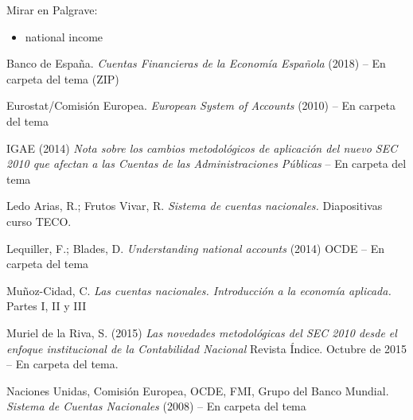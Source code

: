 \documentclass{nuevotema}
\begin{document}
\bibliografia

Mirar en Palgrave:

\begin{itemize}
	\item national income
\end{itemize}

Banco de España. \textit{Cuentas Financieras de la Economía Española} (2018) -- En carpeta del tema (ZIP)

Eurostat/Comisión Europea. \textit{European System of Accounts} (2010) -- En carpeta del tema

IGAE (2014) \textit{Nota sobre los cambios metodológicos de aplicación del nuevo SEC 2010 que afectan a las Cuentas de las Administraciones Públicas} -- En carpeta del tema

Ledo Arias, R.; Frutos Vivar, R. \textit{Sistema de cuentas nacionales.} Diapositivas curso TECO.

Lequiller, F.; Blades, D. \textit{Understanding national accounts} (2014) OCDE -- En carpeta del tema

Muñoz-Cidad, C. \textit{Las cuentas nacionales. Introducción a la economía aplicada.} Partes I, II y III

Muriel de la Riva, S. (2015) \textit{Las novedades metodológicas del SEC 2010 desde el enfoque institucional de la Contabilidad Nacional} Revista Índice. Octubre de 2015 -- En carpeta del tema. 

Naciones Unidas, Comisión Europea, OCDE, FMI, Grupo del Banco Mundial. \textit{Sistema de Cuentas Nacionales} (2008) -- En carpeta del tema
\end{document}
